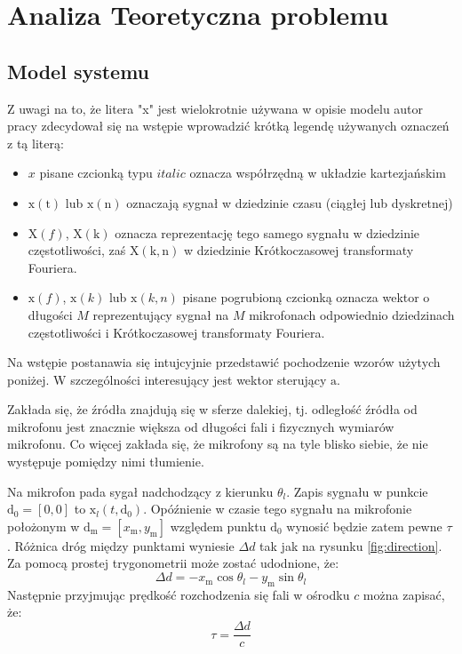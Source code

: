 \chapter{Analiza Teoretyczna problemu}
\label{chapter-2}
\section{Model systemu}

Z uwagi na to, że litera "x" jest wielokrotnie używana w opisie modelu autor pracy zdecydował się na wstępie wprowadzić krótką legendę używanych oznaczeń z tą literą:
\begin{itemize}
    \item $x$ pisane czcionką typu $italic$ oznacza współrzędną w układzie kartezjańskim
    \item $\mathrm{x(t)}$ lub $\mathrm{x(n)}$ oznaczają sygnał w dziedzinie czasu (ciągłej lub dyskretnej)
    \item $\mathrm{X}(f)$, $\mathrm{X(k)}$ oznacza reprezentację tego samego sygnału w dziedzinie częstotliwości, zaś $\mathrm{X(k,n)}$ w dziedzinie Krótkoczasowej transformaty Fouriera.
    \item $\bm{\mathrm{x}}(f)$, $\bm{\mathrm{x}}(k)$ lub $\bm{\mathrm{x}}(k,n)$ pisane pogrubioną czcionką oznacza wektor o długości $M$ reprezentujący sygnał na $M$ mikrofonach odpowiednio dziedzinach częstotliwości i Krótkoczasowej transformaty Fouriera.
\end{itemize}


\noindent Na wstępie postanawia się intujcyjnie przedstawić pochodzenie wzorów użytych poniżej. W szczególności interesujący jest wektor sterujący $\bm{\mathrm{a}}$.

\noindent Zakłada się, że źródła znajdują się w sferze dalekiej, tj. odległość źródła od mikrofonu jest znacznie większa od długości fali i fizycznych wymiarów mikrofonu. Co więcej zakłada się, że mikrofony są na tyle blisko siebie, że nie występuje pomiędzy nimi tłumienie.

\noindent Na mikrofon pada sygał nadchodzący z kierunku $\theta_{l}$.
Zapis sygnału w punkcie $\bm{\mathrm{d}}_{0} = [0,0]$ to $\mathrm{x}_{l}(t,\bm{\mathrm{d}}_{0})$. Opóźnienie w czasie tego sygnału na mikrofonie położonym w $\bm{\mathrm{d}}_{\mathrm{m}} = [x_{\mathrm{m}},y_{\mathrm{m}}]$ względem punktu $\bm{\mathrm{d}}_{0}$ wynosić będzie zatem pewne $\tau$. Różnica dróg między punktami wyniesie $\Delta d$ tak jak na rysunku \ref{fig:direction}. Za pomocą prostej trygonometrii może zostać udodnione, że:
\begin{equation}
    \label{equation:2.4}
    \Delta d = -x_{\mathrm{m}}\cos{\theta_{l}} - y_{\mathrm{m}}\sin{\theta_{l}}
\end{equation}
Następnie przyjmując prędkość rozchodzenia się fali w ośrodku $c$ można zapisać, że:
\begin{equation}
    \label{equation:2.5}
    \tau = \dfrac{\Delta d}{c}
\end{equation}

